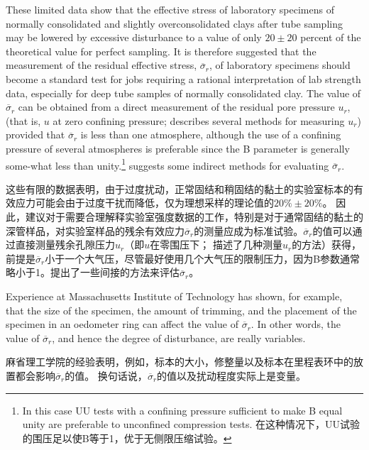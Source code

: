 


\begin{paracol}{2}
    
    These limited data show that the effective stress of laboratory specimens of normally consolidated and slightly overconsolidated clays after tube sampling may be lowered by excessive disturbance to a value of only $20\pm20$ percent of the theoretical value for perfect sampling. It is therefore suggested that the measurement of the residual effective stress, $\overline{\sigma}_r$, of laboratory specimens should become a standard test for jobs requiring a rational interpretation of lab strength data, especially for deep tube samples of normally consolidated clay. The value of $\overline{\sigma}_r$ can be obtained from a direct measurement of the residual pore pressure $u_r$, (that is, $u$ at zero confining pressure; \cite{Lambe1961207} describes several methods for measuring $u_r$) provided that $\overline{\sigma}_r$ is less than one atmosphere, although the use of a confining pressure of several atmospheres is preferable since the B parameter is generally some-what less than unity.\footnote{
        In this case UU tests with a confining pressure sufficient to make B equal unity are preferable to unconfined compression tests. 在这种情况下，UU试验的围压足以使B等于1，优于无侧限压缩试验。
    } \citet{Skempton1961351} suggests some indirect methods for evaluating $\overline{\sigma}_r$.

    \switchcolumn

    这些有限的数据表明，由于过度扰动，正常固结和稍固结的黏土的实验室标本的有效应力可能会由于过度干扰而降低，仅为理想采样的理论值的$20\%\pm{}20\%$。 因此，建议对于需要合理解释实验室强度数据的工作，特别是对于通常固结的黏土的深管样品，对实验室样品的残余有效应力$\overline{\sigma}_r$的测量应成为标准试验。$\overline{\sigma}_r$的值可以通过直接测量残余孔隙压力$u_r$（即$u$在零围压下； \cite{Lambe1961207}描述了几种测量$u_r$的方法）获得，前提是$\overline{\sigma}_r$小于一个大气压，尽管最好使用几个大气压的限制压力，因为B参数通常略小于1。\citet{Skempton1961351}提出了一些间接的方法来评估$\overline{\sigma}_r$。

    \switchcolumn*

    Experience at Massachusetts Institute of Technology has shown, for example, that the size of the specimen, the amount of trimming, and the placement of the specimen in an oedometer ring can affect the value of $\overline{\sigma}_r$. In other words, the value of $\overline{\sigma}_r$, and hence the degree of disturbance, are really variables.

    \switchcolumn

    麻省理工学院的经验表明，例如，标本的大小，修整量以及标本在里程表环中的放置都会影响$\overline{\sigma}_r$的值。 换句话说，$\overline{\sigma}_r$的值以及扰动程度实际上是变量。

\end{paracol}